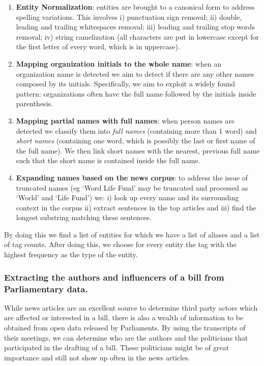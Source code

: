 \begin{enumerate}

\item \textbf{Entity Normalization}: entities are brought to a canonical form to address spelling variations. This involves i) punctuation sign removal; ii) double, leading and trailing whitespaces removal; iii) leading and trailing stop words removal; iv) string camelization (all characters are put in lowercase except for the first letter of every word, which is in uppercase). 

\item \textbf{Mapping organization initials to the whole name}: when an organization name is detected we aim to detect if there are any other names composed by its initials. Specifically, we aim to exploit a widely found pattern: organizations often have the full name followed by the initials inside parenthesis. 

\item \textbf{Mapping partial names with full names}: when person names are detected we classify them into \emph{full names} (containing more than 1 word) and \emph{short names} (containing one word, which is possibly the last or first name of the full name). We then link short names with the nearest, previous full name such that the short name is contained inside the full name.

\item \textbf{Expanding names based on the news corpus}: to address the issue of truncated names (eg `Word Life Fund' may be truncated and processed as `World' and `Life Fund')  we: i) look up every name and its surrounding context in the corpus ii) extract sentences in the top articles and iii) find the longest substring matching these sentences. 
\end{enumerate}

By doing this we find a list of entities for which we have a list of aliases and a list of tag counts. After doing this, we choose for every entity the tag with the highest frequency as the type of the entity. \\

\subsubsection{Extracting the authors and influencers of a bill from Parliamentary data.}\label{political-actors-from-parliamentary-data}

While news articles are an excellent source to determine third party actors which are affected or interested in a bill, there is also a wealth of information to be obtained from open data released by Parliaments. By using the transcripts of their meetings, we can determine who are the authors and the politicians that participated in the drafting of a bill. These politicians might be of great importance and still not show up often in the news articles. \\

